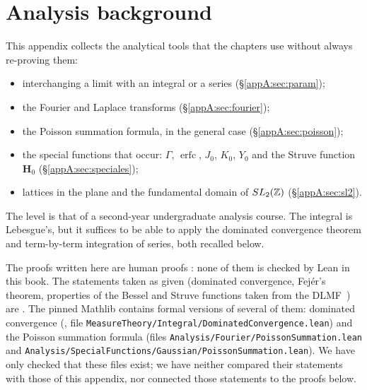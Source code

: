 \chapter{Analysis background}\label{appA:chap}

This appendix collects the analytical tools that the chapters use without always re-proving them:
\begin{itemize}
\item interchanging a limit with an integral or a series (§\ref{appA:sec:param});
\item the Fourier and Laplace transforms (§\ref{appA:sec:fourier});
\item the Poisson summation formula, in the general case (§\ref{appA:sec:poisson});
\item the special functions that occur: $\Gamma$, $\operatorname{erfc}$, $J_0$, $K_0$, $Y_0$ and the Struve
function $\mathbf H_0$ (§\ref{appA:sec:speciales});
\item lattices in the plane and the fundamental domain of $SL_2(\mathbb{Z})$ (§\ref{appA:sec:sl2}).
\end{itemize}
The level is that of a second-year undergraduate analysis course. The integral is Lebesgue's, but it suffices to be
able to apply the dominated convergence theorem and term-by-term integration of series, both recalled below.

\begin{warnbox}
The proofs written here are human proofs \tierC{}: none of them is checked by Lean in this book.
The statements taken as given (dominated convergence, Fejér's theorem, properties of the Bessel and Struve functions
taken from the DLMF~\cite{app:dlmf}) are \tierL. The pinned Mathlib contains formal versions of several of them:
dominated convergence (, file
\texttt{MeasureTheory/Integral/DominatedConvergence.lean}) and the Poisson summation formula (files
\texttt{Analysis/Fourier/PoissonSummation.lean} and \texttt{Analysis/SpecialFunctions/Gaussian/PoissonSummation.lean}).
We have only checked that these files exist; we have neither compared their statements with those of this appendix,
nor connected those statements to the proofs below.
\end{warnbox}

